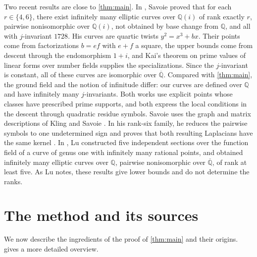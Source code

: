 \documentclass[12pt,oneside,openany]{book}
\theoremstyle{definition}
\theoremstyle{plain}
\numberwithin{equation}{chapter}
\theoremstyle{plain}
\theoremstyle{definition}
\theoremstyle{remark}
\newcommand{\Q}{\mathbb Q}
\newcommand{\Qbar}{\overline{\mathbb Q}}
\begin{document}
Two recent results are close to \cref{thm:main}. In \cite[Theorem~1.1]{Savoie2026}, Savoie proved that for each $r\in\{4,6\}$, there exist infinitely many elliptic curves over $\Q(i)$ of rank exactly $r$, pairwise nonisomorphic over $\Q(i)$, not obtained by base change from $\Q$, and all with $j$-invariant $1728$. His curves are quartic twists $y^2=x^3+bx$. Their points come from factorizations $b=ef$ with $e+f$ a square, the upper bounds come from descent through the endomorphism $1+i$, and Kai's theorem \cite{Kai} on prime values of linear forms over number fields supplies the specializations. Since the $j$-invariant is constant, all of these curves are isomorphic over $\Qbar$. Compared with \cref{thm:main}, the ground field and the notion of infinitude differ: our curves are defined over $\Q$ and have infinitely many $j$-invariants. Both works use explicit points whose classes have prescribed prime supports, and both express the local conditions in the descent through quadratic residue symbols. Savoie uses the graph and matrix descriptions of Kling and Savoie \cite[Theorem~5.2 of the cited preprint]{KlingSavoie2024}. In his rank-six family, he reduces the pairwise symbols to one undetermined sign and proves that both resulting Laplacians have the same kernel \cite[Lemmas~4.1--4.2]{Savoie2026}. In \cite[Proposition~6.1]{Lu2026}, Lu constructed five independent sections over the function field of a curve of genus one with infinitely many rational points, and obtained infinitely many elliptic curves over $\Q$, pairwise nonisomorphic over $\Qbar$, of rank at least five. As Lu notes, these results give lower bounds and do not determine the ranks.

\section{The method and its sources}\label{sec:intro-method}

We now describe the ingredients of the proof of \cref{thm:main} and their origins.  gives a more detailed overview.
\end{document}
